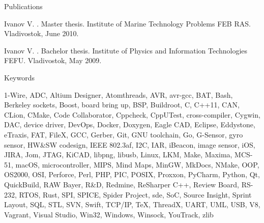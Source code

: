 \documentclass{template}
\begin{document}

\begin{rSection}{Publications}
\begin{rItemize}

\item Ivanov V. . Master thesis. \newline
      Institute of Marine Technology Problems FEB RAS. Vladivostok, June 2010.
\item Ivanov V. . Bachelor thesis. \newline
      Institute of Physics and Information Technologies FEFU. Vladivostok, May 2009.

\end{rItemize}
\end{rSection}


\begin{rSection}{Keywords}

1-Wire, ADC, Altium Designer, Atomthreads, AVR, avr-gcc, BAT, Bash, Berkeley sockets, Boost, board bring up, BSP, Buildroot, C, C++11, CAN,
CLion, CMake, Code Collaborator, Cppcheck, CppUTest, cross-compiler, Cygwin, DAC, device driver, DevOps, Docker, Doxygen, Eagle CAD, Eclipse,
Eddystone, eTraxis, FAT, FileX, GCC, Gerber, Git, GNU toolchain, Go, G-Sensor, gyro sensor, HW\&SW codesign, IEEE 802.3af, I2C, IAR, iBeacon,
image sensor, iOS, JIRA, Jom, JTAG, KiCAD, libpng, libusb, Linux, LKM, Make, Maxima, MCS-51, macOS, microcontroller, MIPS, Mind Maps, MinGW,
MkDocs, NMake, OOP, OS2000, OSI, Perforce, Perl, PHP, PIC, POSIX, Proxxon, PyCharm, Python, Qt, QuickBuild, RAW Bayer, R\&D, Redmine, ReSharper
C++, Review Board, RS-232, RTOS, Rust, SPI, SPICE, Spider Project, sde, SoC, Source Insight, Sprint Layout, SQL, STL, SVN, Swift, TCP/IP, \TeX,
ThreadX, UART, UML, USB, V8, Vagrant, Visual Studio, Win32, Windows, Winsock, YouTrack, zlib

\end{rSection}

\end{document}

